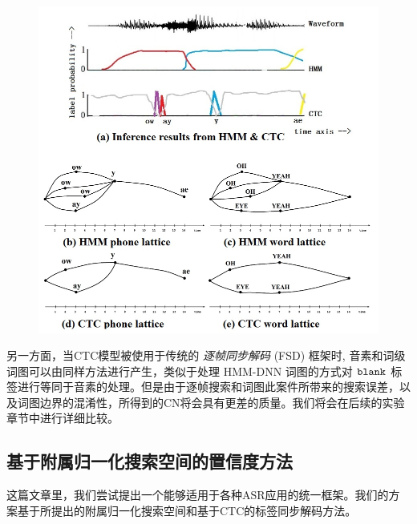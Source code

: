 \begin{figure}[!htp]
  \centering
    \captionstyle{\centering}
    \includegraphics[width=\textwidth]{figure/lat-exp.jpg}
\end{figure}

另一方面，当CTC模型被使用于传统的 {\em 逐帧同步解码} (FSD) 框架时, 音素和词级词图可以由同样方法进行产生\cite{povey2012generating}，类似于处理 HMM-DNN 词图的方式对 $\tt blank$ 标签进行等同于音素的处理。但是由于逐帧搜索和词图此案件所带来的搜索误差，以及词图边界的混淆性，所得到的CN将会具有更差的质量。我们将会在后续的实验章节中进行详细比较。

%


  \subsection{基于附属归一化搜索空间的置信度方法}
  \label{Sec:norm-gragh}

这篇文章里，我们尝试提出一个能够适用于各种ASR应用的统一框架。我们的方案基于所提出的附属归一化搜索空间和基于CTC的标签同步解码方法。

